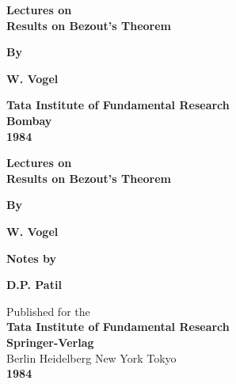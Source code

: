 \thispagestyle{empty}
\begin{center}
{\Large\bf Lectures on}\\[5pt]
\textbf{\Large Results on Bezout's Theorem}
\vskip 1cm

{\bf By}
\medskip

{\large\bf W. Vogel}
\vfill

{\bf Tata Institute of Fundamental Research}\\[3pt]
{\bf Bombay}\\[3pt]
{\bf 1984}
\end{center}
\eject

\thispagestyle{empty}

\begin{center}
{\Large\bf Lectures on}\\[20pt]
{\Large\bf Results on Bezout's Theorem}\\
\vfill

{\bf By}
\medskip

{\large\bf W. Vogel}
\vfill

{\bf Notes by}
\medskip

{\large\bf D.P. Patil}
\vfill


{Published for the}\\[5pt]
{\bf Tata Institute of Fundamental Research}\\
{\large\bf Springer-Verlag}\\
{Berlin Heidelberg New York Tokyo}\\
{\bf 1984}
\end{center}
\eject

\thispagestyle{empty}


